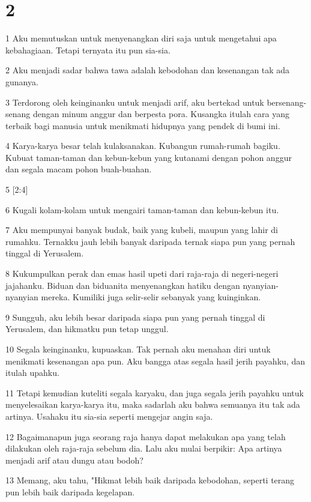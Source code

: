 \chapter{2}

\par 1 Aku memutuskan untuk menyenangkan diri saja untuk mengetahui apa kebahagiaan. Tetapi ternyata itu pun sia-sia.
\par 2 Aku menjadi sadar bahwa tawa adalah kebodohan dan kesenangan tak ada gunanya.
\par 3 Terdorong oleh keinginanku untuk menjadi arif, aku bertekad untuk bersenang-senang dengan minum anggur dan berpesta pora. Kusangka itulah cara yang terbaik bagi manusia untuk menikmati hidupnya yang pendek di bumi ini.
\par 4 Karya-karya besar telah kulaksanakan. Kubangun rumah-rumah bagiku. Kubuat taman-taman dan kebun-kebun yang kutanami dengan pohon anggur dan segala macam pohon buah-buahan.
\par 5 [2:4]
\par 6 Kugali kolam-kolam untuk mengairi taman-taman dan kebun-kebun itu.
\par 7 Aku mempunyai banyak budak, baik yang kubeli, maupun yang lahir di rumahku. Ternakku jauh lebih banyak daripada ternak siapa pun yang pernah tinggal di Yerusalem.
\par 8 Kukumpulkan perak dan emas hasil upeti dari raja-raja di negeri-negeri jajahanku. Biduan dan biduanita menyenangkan hatiku dengan nyanyian-nyanyian mereka. Kumiliki juga selir-selir sebanyak yang kuinginkan.
\par 9 Sungguh, aku lebih besar daripada siapa pun yang pernah tinggal di Yerusalem, dan hikmatku pun tetap unggul.
\par 10 Segala keinginanku, kupuaskan. Tak pernah aku menahan diri untuk menikmati kesenangan apa pun. Aku bangga atas segala hasil jerih payahku, dan itulah upahku.
\par 11 Tetapi kemudian kuteliti segala karyaku, dan juga segala jerih payahku untuk menyelesaikan karya-karya itu, maka sadarlah aku bahwa semuanya itu tak ada artinya. Usahaku itu sia-sia seperti mengejar angin saja.
\par 12 Bagaimanapun juga seorang raja hanya dapat melakukan apa yang telah dilakukan oleh raja-raja sebelum dia. Lalu aku mulai berpikir: Apa artinya menjadi arif atau dungu atau bodoh?
\par 13 Memang, aku tahu, "Hikmat lebih baik daripada kebodohan, seperti terang pun lebih baik daripada kegelapan.
